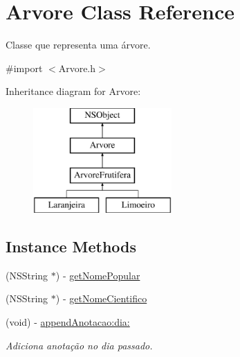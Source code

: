 \hypertarget{interface_arvore}{}\section{Arvore Class Reference}
\label{interface_arvore}


Classe que representa uma árvore.  




{\ttfamily \#import $<$Arvore.\+h$>$}

Inheritance diagram for Arvore\+:\begin{figure}[H]
\begin{center}
\leavevmode
\includegraphics[height=4.000000cm]{interface_arvore}
\end{center}
\end{figure}
\subsection*{Instance Methods}
\begin{DoxyCompactItemize}
\item 
(N\+S\+String $\ast$) -\/ \hyperlink{interface_arvore_a660cb6ff62fd1d1a42113af3cb5ec55e}{get\+Nome\+Popular}
\item 
(N\+S\+String $\ast$) -\/ \hyperlink{interface_arvore_a2316550aad9b4ccb9ce44ce28c17f84c}{get\+Nome\+Cientifico}
\item 
(void) -\/ \hyperlink{interface_arvore_afd29b615282d878986e2ba7e66fc0255}{append\+Anotacao\+:dia\+:}
\begin{DoxyCompactList}\small\item\em Adiciona anotação no dia passado. \end{DoxyCompactList}\end{DoxyCompactItemize}
